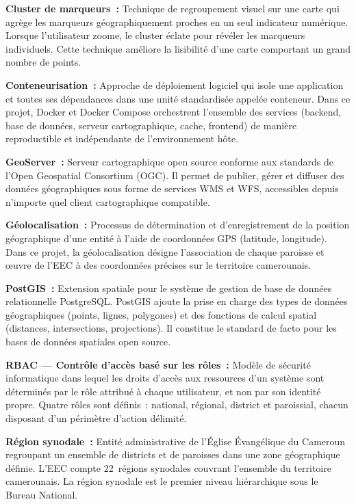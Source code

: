 \documentclass[12pt, a4paper]{report}
\begin{document}
\vspace{6pt}

\noindent\textbf{Cluster de marqueurs~:}
Technique de regroupement visuel sur une carte qui agrège les marqueurs
géographiquement proches en un seul indicateur numérique. Lorsque l'utilisateur
zoome, le cluster éclate pour révéler les marqueurs individuels. Cette technique
améliore la lisibilité d'une carte comportant un grand nombre de points.

\medskip
\noindent\textbf{Conteneurisation~:}
Approche de déploiement logiciel qui isole une application et toutes ses
dépendances dans une unité standardisée appelée conteneur. Dans ce projet, Docker
et Docker Compose orchestrent l'ensemble des services (backend, base de données,
serveur cartographique, cache, frontend) de manière reproductible et indépendante
de l'environnement hôte.

\medskip
\noindent\textbf{GeoServer~:}
Serveur cartographique open source conforme aux standards de l'Open Geospatial
Consortium (OGC). Il permet de publier, gérer et diffuser des données
géographiques sous forme de services WMS et WFS, accessibles depuis n'importe
quel client cartographique compatible.

\medskip
\noindent\textbf{Géolocalisation~:}
Processus de détermination et d'enregistrement de la position géographique d'une
entité à l'aide de coordonnées GPS (latitude, longitude). Dans ce projet, la
géolocalisation désigne l'association de chaque paroisse et œuvre de l'EEC à des
coordonnées précises sur le territoire camerounais.

\medskip
\noindent\textbf{PostGIS~:}
Extension spatiale pour le système de gestion de base de données relationnelle
PostgreSQL. PostGIS ajoute la prise en charge des types de données géographiques
(points, lignes, polygones) et des fonctions de calcul spatial (distances,
intersections, projections). Il constitue le standard de facto pour les bases de
données spatiales open source.

\medskip
\noindent\textbf{RBAC --- Contrôle d'accès basé sur les rôles~:}
Modèle de sécurité informatique dans lequel les droits d'accès aux ressources
d'un système sont déterminés par le rôle attribué à chaque utilisateur, et non
par son identité propre. Quatre rôles sont définis~: national, régional, district
et paroissial, chacun disposant d'un périmètre d'action délimité.

\medskip
\noindent\textbf{Région synodale~:}
Entité administrative de l'Église Évangélique du Cameroun regroupant un ensemble
de districts et de paroisses dans une zone géographique définie. L'EEC compte
22~régions synodales couvrant l'ensemble du territoire camerounais. La région
synodale est le premier niveau hiérarchique sous le Bureau National.
\end{document}
